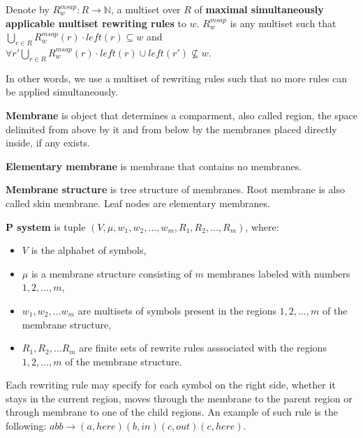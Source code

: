 \documentclass[a4paper,10pt]{article}
\begin{document}
\begin{definicia}
  Denote by $R^{msap}_w: R\rightarrow \mathbb N$, a multiset over $R$ of {\bf maximal simultaneously applicable multiset rewriting rules} to $w$. $R^{msap}_w$ is any multiset such that $\displaystyle\bigcup_{r\in R} R^{msap}_w(r)\cdot left(r)\subseteq w$ and $\forall r' \displaystyle\bigcup_{r\in R} R^{msap}_w(r)\cdot left(r)\cup left(r')\nsubseteq w$.
\end{definicia}

In other words, we use a multiset of rewriting rules such that no more rules can be applied simultaneously.

\begin{definicia}
  {\bf Membrane} is object that determines a comparment, also called region, the space delimited from above by it and from below by the membranes placed directly inside, if any exists.
\end{definicia}

\begin{definicia}
  {\bf Elementary membrane} is membrane that contains no membranes.
\end{definicia}

\begin{definicia}
  {\bf Membrane structure} is tree structure of membranes. Root membrane is also called skin membrane. Leaf nodes are elementary membranes.
\end{definicia}

\begin{definicia}
  {\bf P system} is tuple $(V, \mu, w_1, w_2,\dots , w_m, R_1, R_2, \dots , R_m)$, where:
  \begin{itemize}
    \item $V$ is the alphabet of symbols,
    \item $\mu$ is a membrane structure consisting of $m$ membranes labeled with numbers $1,2,\dots,m$,
    \item $w_1,w_2,\dots w_m$ are multisets of symbols present in the regions $1,2,\dots,m$ of the membrane structure,
    \item $R_1,R_2,\dots R_m$ are finite sets of rewrite rules asssociated with the regions $1,2,\dots,m$ of the membrane structure.
  \end{itemize}
\end{definicia}

Each rewriting rule may specify for each symbol on the right side, whether it stays in the current region, moves through the membrane to the parent region or through membrane to one of the child regions. An example of such rule is the following: $abb\rightarrow (a,here)(b,in)(c,out)(c,here)$.
\end{document}
